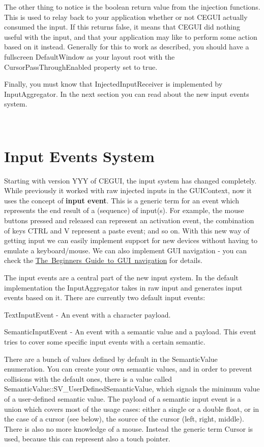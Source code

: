 The other thing to notice is the boolean return value from the injection functions. This is used to relay back to your application whether or not C\+E\+G\+UI actually consumed the input. If this returns false, it means that C\+E\+G\+UI did nothing useful with the input, and that your application may like to perform some action based on it instead. Generally for this to work as described, you should have a fullscreen Default\+Window as your layout root with the Cursor\+Pass\+Through\+Enabled property set to true.

Finally, you must know that Injected\+Input\+Receiver is implemented by Input\+Aggregator. In the next section you can read about the new input events system.

~\newline
 \hypertarget{input_tutorial_input_tutorial_inputevents}{}\section{Input Events System}\label{input_tutorial_input_tutorial_inputevents}
Starting with version Y\+YY of C\+E\+G\+UI, the input system has changed completely. While previously it worked with raw injected inputs in the G\+U\+I\+Context, now it uses the concept of {\bfseries{input event}}. This is a generic term for an event which represents the end result of a (sequence) of input(s). For example, the mouse buttons pressed and released can represent an activation event, the combination of keys C\+T\+RL and V represent a paste event; and so on. With this new way of getting input we can easily implement support for new devices without having to emulate a keyboard/mouse. We can also implement G\+UI navigation -\/ you can check the \mbox{\hyperlink{gui_navigation_tutorial}{The Beginners Guide to G\+UI navigation}} for details.

The input events are a central part of the new input system. In the default implementation the Input\+Aggregator takes in raw input and generates input events based on it. There are currently two default input events\+:
\begin{DoxyItemize}
\item Text\+Input\+Event -\/ An event with a character payload.
\item Semantic\+Input\+Event -\/ An event with a semantic value and a payload. This event tries to cover some specific input events with a certain semantic.
\end{DoxyItemize}

There are a bunch of values defined by default in the Semantic\+Value enumeration. You can create your own semantic values, and in order to prevent collisions with the default ones, there is a value called Semantic\+Value\+::\+S\+V\+\_\+\+User\+Defined\+Semantic\+Value, which signals the minimum value of a user-\/defined semantic value. The payload of a semantic input event is a union which covers most of the usage cases\+: either a single or a double float, or in the case of a cursor (see below), the source of the cursor (left, right, middle). There is also no more knowledge of a mouse. Instead the generic term Cursor is used, because this can represent also a touch pointer.

